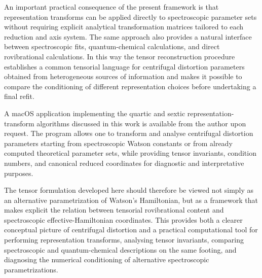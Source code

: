 An important practical consequence of the present framework is that
representation transforms can be applied directly to spectroscopic
parameter sets without requiring explicit analytical transformation
matrices tailored to each reduction and axis system. The same approach
also provides a natural interface between spectroscopic fits,
quantum-chemical calculations, and direct rovibrational calculations.
In this way the tensor reconstruction procedure establishes a common
tensorial language for centrifugal distortion parameters obtained from
heterogeneous sources of information and makes it possible to compare
the conditioning of different representation choices before
undertaking a final refit.

A macOS application implementing the quartic and sextic
representation-transform algorithms discussed in this work is
available from the author upon request. The program allows one to
transform and analyse centrifugal distortion parameters starting from
spectroscopic Watson constants or from already computed theoretical
parameter sets, while providing tensor invariants, condition numbers,
and canonical reduced coordinates for diagnostic and interpretative
purposes.

The tensor formulation developed here should therefore be viewed not
simply as an alternative parametrization of Watson's Hamiltonian, but
as a framework that makes explicit the relation between tensorial
rovibrational content and spectroscopic effective-Hamiltonian
coordinates. This provides both a clearer conceptual picture of
centrifugal distortion and a practical computational tool for
performing representation transforms, analysing tensor invariants,
comparing spectroscopic and quantum-chemical descriptions on the same
footing, and diagnosing the numerical conditioning of alternative
spectroscopic parametrizations.
